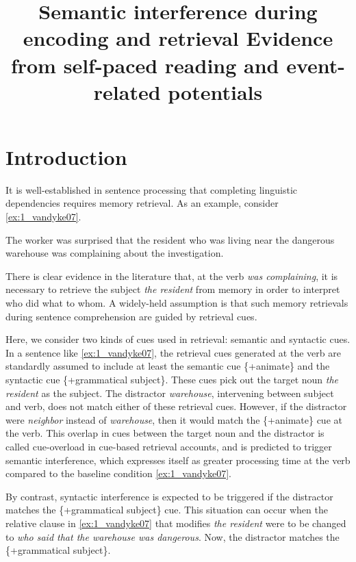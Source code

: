 \documentclass[a4paper, man, floatsintext]{apa7}
\title{\hspace{1cm}Semantic interference during encoding and retrieval \newline
Evidence from self-paced reading and event-related potentials}
\affiliation{
Department of Linguistics, University of Potsdam}
\begin{document}
\maketitle

\section{Introduction}

It is well-established in sentence processing that completing linguistic dependencies requires memory retrieval. As an example, consider 
\ref{ex:1_vandyke07}.

\begin{exe}[ht]
\ex \label{ex:1_vandyke07} 
The worker was surprised that the resident who was living near the dangerous warehouse was complaining about the investigation. \parencite{vandyke07}
\end{exe}

There is clear evidence in the literature  \parencite[e.g.,][]{jaeger_etal_2020, nicenboim, vandyke_mcelree06, vandyke_lewis03} that, at the verb \textit{was complaining}, it is necessary to retrieve the subject \textit{the resident} from memory in order to interpret who did what to whom. A widely-held assumption is that such memory retrievals during sentence comprehension are guided by retrieval cues. 

Here, we consider two kinds of cues used in retrieval: semantic and  syntactic cues.
In a sentence like \ref{ex:1_vandyke07}, the retrieval cues generated at the verb are standardly assumed to include at least  the semantic cue \{+animate\} and the syntactic cue \{+grammatical subject\}. These cues pick out the target noun \textit{the resident} as the subject. The distractor \textit{warehouse}, intervening between subject and verb, does not match either of these retrieval cues. However, if the distractor were \textit{neighbor} instead of \textit{warehouse}, then it would match the \{+animate\} cue at the verb. This overlap in cues between the target noun and the distractor is called cue-overload in cue-based retrieval accounts, and is predicted to trigger semantic interference, which expresses itself as greater processing time at the verb compared to the baseline condition \ref{ex:1_vandyke07}.

By contrast, syntactic interference is expected to be triggered if the distractor matches the \{+grammatical subject\} cue. This situation can occur when the relative clause  in \ref{ex:1_vandyke07} that modifies \textit{the resident} were to be changed to \textit{who said that the warehouse was dangerous}. Now, the distractor matches the \{+grammatical subject\}. 
\end{document}
